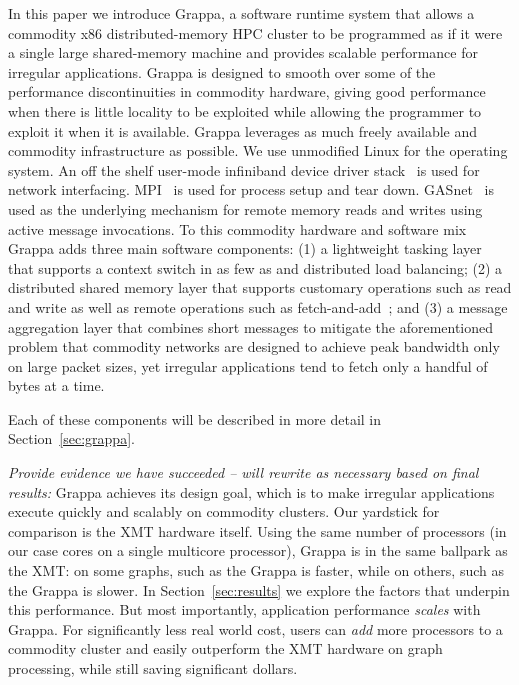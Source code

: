 In this paper we introduce Grappa, a software runtime system that allows a
commodity x86 distributed-memory HPC cluster to be programmed as if it were a
single large shared-memory machine and provides scalable performance for
irregular applications. Grappa is designed to smooth over some of the
performance discontinuities in commodity hardware, giving good performance
when there is little locality to be exploited while allowing the programmer to
exploit it when it is available. Grappa leverages as much freely available and
commodity infrastructure as possible. We use unmodified Linux for the
operating system. An off the shelf user-mode infiniband device driver
stack~\cite{Melonox?} is used for network interfacing. MPI~\cite{mpi} is used
for process setup and tear down. GASnet~\cite{gasnet} is used as the
underlying mechanism for remote memory reads and writes using active message
invocations. To this commodity hardware and software mix Grappa adds three
main software components: (1) a lightweight tasking layer that supports a
context switch in as few as  and distributed load balancing; (2)
a distributed shared memory layer that supports customary operations such as
read and write as well as remote operations such as
fetch-and-add~\cite{fetchandadd}; and (3) a message aggregation layer that
combines short messages to mitigate the aforementioned problem that commodity
networks are designed to achieve peak bandwidth only on large packet sizes,
yet irregular applications tend to fetch only a handful of bytes at a time.



Each of these components will be described in more detail in Section~\ref{sec:grappa}.

{\em Provide evidence we have succeeded -- will rewrite as necessary based on final results:}
Grappa achieves its design goal, which is to make irregular applications execute quickly and scalably on commodity clusters.  Our yardstick for comparison is the XMT hardware itself.  Using the same number of processors (in our case cores on a single multicore processor), Grappa is in the same ballpark as the XMT: on some graphs, such as the  Grappa is  faster, while on others, such as the  Grappa is  slower.  In Section~\ref{sec:results} we explore the factors that underpin this performance.  But most importantly, application performance \emph{scales} with Grappa.  For significantly less real world cost, users can \emph{add} more processors to a commodity cluster and easily outperform the XMT hardware on graph processing, while still saving significant dollars.





